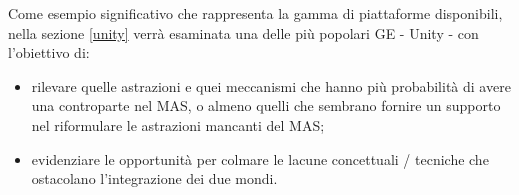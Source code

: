 \medskip

Come esempio significativo che rappresenta la gamma di piattaforme disponibili, nella sezione \ref{unity} verrà esaminata una delle più popolari GE - Unity\cite{unity} - con l'obiettivo di:
\begin{itemize}
    \item rilevare quelle astrazioni e quei meccanismi che hanno più probabilità di avere una controparte nel MAS, o almeno quelli che sembrano fornire un supporto nel riformulare le astrazioni mancanti del MAS;
    \item evidenziare le opportunità per colmare le lacune concettuali / tecniche che ostacolano l'integrazione dei due mondi.
\end{itemize}
